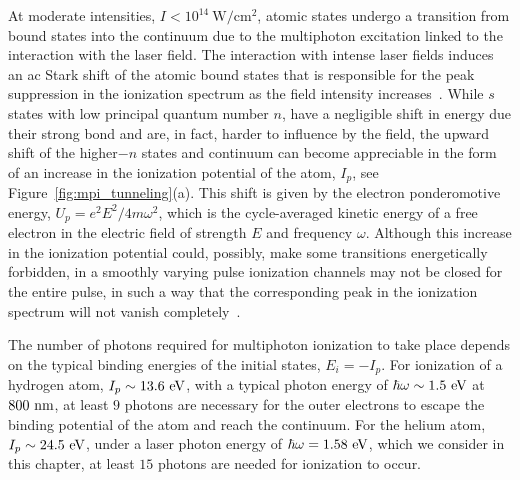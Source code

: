 At moderate intensities, $I < 10^{14}\ \mathrm{W/cm^{2}}$, atomic
states undergo a transition from bound states into the continuum due
to the multiphoton excitation linked to the interaction with the laser
field. The interaction with intense laser fields induces an ac Stark
shift of the atomic bound states that is responsible for the peak
suppression in the ionization spectrum as the field intensity
increases~\cite{MullerStark_1988}. While $s$ states with low principal
quantum number $n$, have a negligible shift in energy due their strong
bond and are, in fact, harder to influence by the field, the upward
shift of the higher$-n$ states and continuum can become appreciable in
the form of an increase in the ionization potential of the atom,
$I_{p}$, see Figure~\ref{fig:mpi_tunneling}(a). This shift is given by
the electron ponderomotive energy, $U_{p} = e^{2}E^{2} /
4m\omega^{2}$, which is the cycle-averaged kinetic energy of a free
electron in the electric field of strength $E$ and frequency
$\omega$. Although this increase in the ionization potential could,
possibly, make some transitions energetically forbidden, in a smoothly
varying pulse ionization channels may not be closed for the entire
pulse, in such a way that the corresponding peak in the ionization
spectrum will not vanish
completely~\cite{Protopapas_mpi_tunneling,Joachain_mpi_tunneling}.

The number of photons required for multiphoton ionization to take
place depends on the typical binding energies of the initial states,
$E_{i} = -I_{p}$. For ionization of a hydrogen atom, $I_{p} \sim
13.6\ \rm{eV}$, with a typical photon energy of $\hbar\omega \sim
1.5\ \rm{eV}$ at $800\ \rm{nm}$, at least $9$ photons are necessary
for the outer electrons to escape the binding potential of the atom
and reach the continuum. For the helium atom, $I_{p} \sim
24.5\ \rm{eV}$, under a laser photon energy of $\hbar\omega =
1.58\ \rm{eV}$, which we consider in this chapter, at least $15$
photons are needed for ionization to occur.


